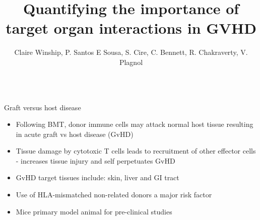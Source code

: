 \documentclass[final,hyperref={pdfpagelabels=false}]{beamer}
\title[GVHD]{Quantifying the importance of target organ interactions in GVHD}
\author[a]{Claire Winship, P. Santos E Sousa, S. Cire, C. Bennett, R. Chakraverty, V. Plagnol}
\begin{document}
\begin{frame}{} 


\begin{columns}[t]
  \begin{column}{.26\linewidth}
    \begin{block}{Graft versus host disease}
{\small  \begin{itemize}
      \item Following BMT, donor immune cells may attack normal host tissue resulting in acute graft vs host disease (GvHD)
  \item Tissue damage by cytotoxic T cells leads to recruitment of other effector cells - increases tissue injury and self perpetuates GvHD
      \item GvHD target tissues include: skin, liver and GI tract
  \item Use of HLA-mismatched non-related donors a major risk factor
      \item Mice primary model animal for pre-clinical studies
      \end{itemize}} 
    \end{block}


\end{column}
\end{columns}
\end{frame}
\end{document}
